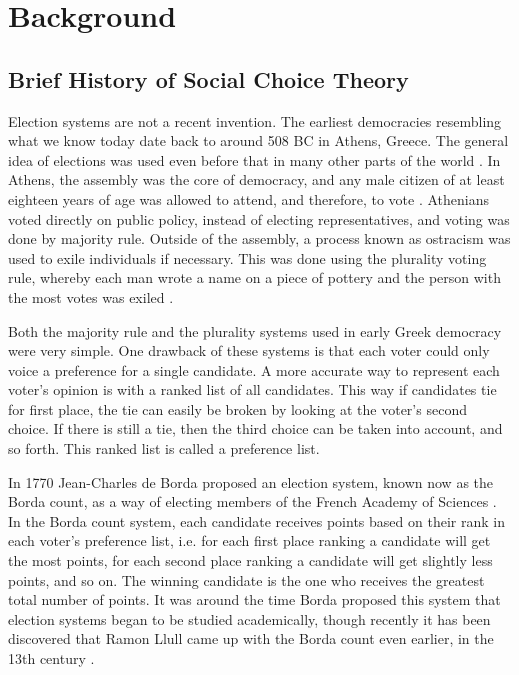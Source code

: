 
\chapter{Background}

\section{Brief History of Social Choice Theory}

	Election systems are not a recent invention. The earliest democracies resembling what we know today date back to around 508 BC in Athens, Greece. The general idea of elections was used even before that in many other parts of the world \cite{democracybritannica}. In Athens, the assembly was the core of democracy, and any male citizen of at least eighteen years of age was allowed to attend, and therefore, to vote \cite{heinemann1952}. Athenians voted directly on public policy, instead of electing representatives, and voting was done by majority rule. Outside of the assembly, a process known as ostracism was used to exile individuals if necessary. This was done using the plurality voting rule, whereby each man wrote a name on a piece of pottery and the person with the most votes was exiled \cite{oturnbull}.

	Both the majority rule and the plurality systems used in early Greek democracy were very simple. One drawback of these systems is that each voter could only voice a preference for a single candidate. A more accurate way to represent each voter's opinion is with a ranked list of all candidates. This way if candidates tie for first place, the tie can easily be broken by looking at the voter's second choice. If there is still a tie, then the third choice can be taken into account, and so forth. This ranked list is called a preference list.

	In 1770 Jean-Charles de Borda proposed an election system, known now as the Borda count, as a way of electing members of the French Academy of Sciences \cite{borda1781mémoire}. In the Borda count system, each candidate receives points based on their rank in each voter's preference list, i.e. for each first place ranking a candidate will get the most points, for each second place ranking a candidate will get slightly less points, and so on. The winning candidate is the one who receives the greatest total number of points. It was around the time Borda proposed this system that election systems began to be studied academically, though recently it has been discovered that Ramon Llull came up with the Borda count even earlier, in the 13th century \cite{hägele2001llull}.

